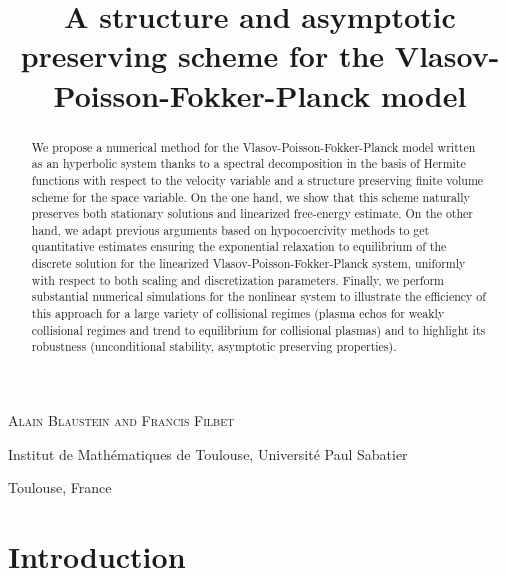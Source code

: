 \documentclass[11pt]{amsart}
\title[A structure and asymptotic preserving scheme for the
Vlasov-Poisson-Fokker-Planck model]{A structure and asymptotic preserving scheme for the Vlasov-Poisson-Fokker-Planck model}
\numberwithin{equation}{section}
\numberwithin{figure}{section}
\begin{document}
\maketitle



\centerline{\scshape Alain Blaustein and Francis Filbet}
\medskip
{\footnotesize
   \centerline{Institut de Math\'ematiques de Toulouse, Universit\'e Paul Sabatier}
    \centerline{Toulouse, France}
}


\bigskip

\begin{abstract}
We propose a numerical method for the
Vlasov-Poisson-Fokker-Planck model written as an hyperbolic system thanks to a spectral decomposition in the basis of Hermite functions with respect to the velocity variable and a structure preserving finite
volume scheme for the space variable. On the one hand, we show that this scheme naturally preserves both
stationary solutions and linearized free-energy estimate. On the other hand, we adapt previous arguments based on
hypocoercivity methods to get quantitative estimates ensuring the exponential relaxation 
to equilibrium of the discrete solution for the linearized
Vlasov-Poisson-Fokker-Planck system, uniformly with respect to both scaling and discretization parameters. Finally, we perform substantial
numerical simulations for the nonlinear system to illustrate the
efficiency of this approach for a large variety of collisional regimes
(plasma echos for weakly collisional regimes and trend to equilibrium
for collisional plasmas) and to highlight its robustness (unconditional stability, asymptotic preserving properties).
\end{abstract}

\vspace{0.1cm}

\tableofcontents

\section{Introduction}
\label{sec:1}
\setcounter{equation}{0}
\setcounter{figure}{0}
\setcounter{table}{0}
\end{document}
